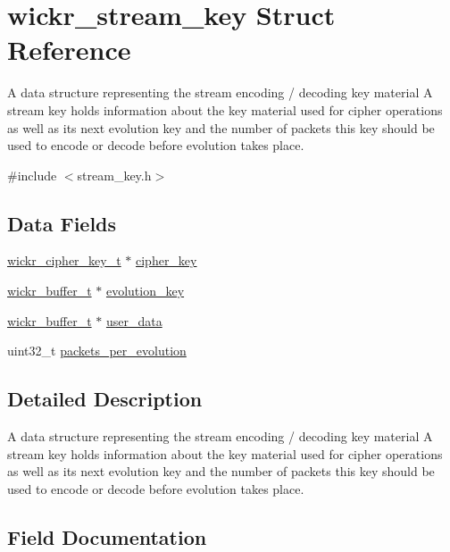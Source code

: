 \hypertarget{structwickr__stream__key}{}\section{wickr\+\_\+stream\+\_\+key Struct Reference}
\label{structwickr__stream__key}


A data structure representing the stream encoding / decoding key material A stream key holds information about the key material used for cipher operations as well as it\textquotesingle{}s next evolution key and the number of packets this key should be used to encode or decode before evolution takes place.  




{\ttfamily \#include $<$stream\+\_\+key.\+h$>$}

\subsection*{Data Fields}
\begin{DoxyCompactItemize}
\item 
\mbox{\hyperlink{structwickr__cipher__key}{wickr\+\_\+cipher\+\_\+key\+\_\+t}} $\ast$ \mbox{\hyperlink{structwickr__stream__key_a3d957a51193dda882cb89ced2ceeb91e}{cipher\+\_\+key}}
\item 
\mbox{\hyperlink{structwickr__buffer}{wickr\+\_\+buffer\+\_\+t}} $\ast$ \mbox{\hyperlink{structwickr__stream__key_ae7210bd67e61cb4c38733a237dae95d9}{evolution\+\_\+key}}
\item 
\mbox{\hyperlink{structwickr__buffer}{wickr\+\_\+buffer\+\_\+t}} $\ast$ \mbox{\hyperlink{structwickr__stream__key_a51e59da9f7fbb0b3e1332a20252d1cc6}{user\+\_\+data}}
\item 
uint32\+\_\+t \mbox{\hyperlink{structwickr__stream__key_a78777e4c64048b6dae38f8772744194e}{packets\+\_\+per\+\_\+evolution}}
\end{DoxyCompactItemize}


\subsection{Detailed Description}
A data structure representing the stream encoding / decoding key material A stream key holds information about the key material used for cipher operations as well as it\textquotesingle{}s next evolution key and the number of packets this key should be used to encode or decode before evolution takes place. 

\subsection{Field Documentation}
\mbox{\label{structwickr__stream__key_a3d957a51193dda882cb89ced2ceeb91e}} 
